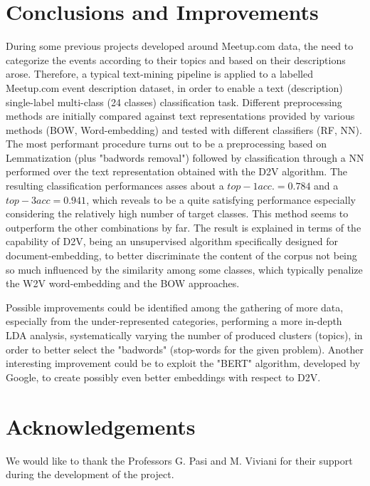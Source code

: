 \documentclass[10pt]{article}
\begin{document}
\section{Conclusions and Improvements}

During some previous projects developed around Meetup.com data, the need to categorize the events according to their topics and based on their descriptions arose. Therefore, a typical text-mining pipeline is applied to a labelled Meetup.com event description dataset, in order to enable a text (description) single-label multi-class (24 classes) classification task.
Different preprocessing methods are initially compared against text representations provided by various methods (BOW, Word-embedding) and tested with different classifiers (RF, NN).
The most performant procedure turns out to be a preprocessing based on Lemmatization (plus "badwords removal") followed by classification through a NN performed over the text representation obtained with the D2V algorithm. 
The resulting classification performances asses about a $top-1 acc. = 0.784$ and a $top-3 acc = 0.941$, which reveals to be a quite satisfying performance especially considering the relatively high number of target classes.
This method seems to outperform the other combinations by far. 
The result is explained in terms of the capability of D2V, being an unsupervised algorithm specifically designed for document-embedding, to better discriminate the content of the corpus not being so much influenced by the similarity among some classes, which typically penalize the W2V word-embedding and the BOW approaches.

Possible improvements could be identified among the gathering of more data, especially from the under-represented categories, performing a more in-depth LDA analysis, systematically varying the number of produced clusters (topics), in order to better select the "badwords" (stop-words for the given problem). Another interesting improvement could be to exploit the "BERT" algorithm, developed by Google, to create possibly even better embeddings with respect to D2V.


\section*{Acknowledgements}
We would like to thank the Professors G. Pasi and M. Viviani for their support during the development of the project.
\end{document}
